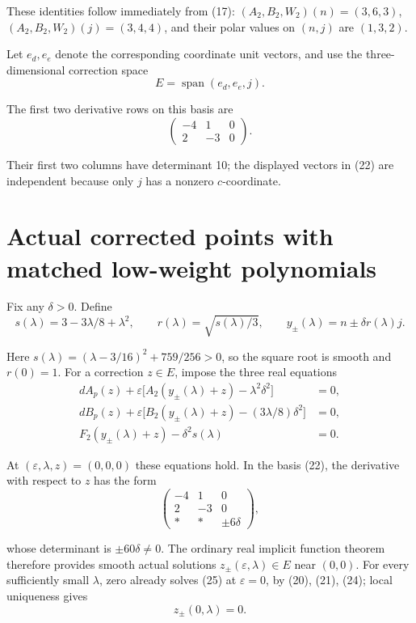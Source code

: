 \documentclass[11pt]{article}
\begin{document}
These identities follow immediately from (17):
\((A_2,B_2,W_2)(n)=(3,6,3)\),
\((A_2,B_2,W_2)(j)=(3,4,4)\), and their polar values on \((n,j)\)
are \((1,3,2)\).

Let \(e_d,e_e\) denote the corresponding coordinate unit vectors, and
use the three-dimensional correction space
\[
E=\operatorname{span}(e_d,e_e,j).
\tag{22}
\]

The first two derivative rows on this basis are
\[
\begin{pmatrix}-4&1&0\\2&-3&0\end{pmatrix}.
\tag{23}
\]

Their first two columns have determinant 10; the displayed vectors in (22)
are independent because only \(j\) has a nonzero \(c\)-coordinate.

\section{Actual corrected points with matched low-weight polynomials}

Fix any \(\delta>0\). Define
\[
s(\lambda)=3-3\lambda/8+\lambda^2,
\qquad r(\lambda)=\sqrt{s(\lambda)/3},
\qquad y_\pm(\lambda)=n\pm\delta r(\lambda)j.
\tag{24}
\]

Here \(s(\lambda)=(\lambda-3/16)^2+759/256>0\), so the square
root is smooth and \(r(0)=1\). For a correction \(z\in E\), impose
the three real equations
\[
\begin{split}
dA_p(z)+\varepsilon\bigl[A_2(y_\pm(\lambda)+z)
                                      -\lambda^2\delta^2\bigr]&=0,\\
dB_p(z)+\varepsilon\bigl[B_2(y_\pm(\lambda)+z)
                                      -(3\lambda/8)\delta^2\bigr]&=0,\\
F_2(y_\pm(\lambda)+z)-\delta^2s(\lambda)&=0.
\end{split}
\tag{25}
\]

At \((\varepsilon,\lambda,z)=(0,0,0)\) these equations hold. In the
basis (22), the derivative with respect to \(z\) has the form
\[
\begin{pmatrix}
-4&1&0\\2&-3&0\\ *&*&\pm6\delta
\end{pmatrix},
\tag{26}
\]

whose determinant is \(\pm60\delta\ne0\). The ordinary real implicit
function theorem therefore provides smooth actual solutions
\(z_\pm(\varepsilon,\lambda)\in E\) near \((0,0)\).
For every sufficiently small \(\lambda\), zero already solves (25) at
\(\varepsilon=0\), by (20), (21), (24); local uniqueness gives
\[
z_\pm(0,\lambda)=0.
\tag{27}
\]
\end{document}
